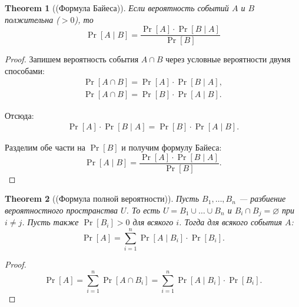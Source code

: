 \documentclass[a4paper]{article}
\theoremstyle{named}
\newtheorem*{namedtheorem}{Theorem}
\begin{document}
\begin{colloq}
        \begin{namedtheorem}[(Формула Байеса)]
            Если вероятность событий $A$ и $B$ полжительна ($> 0$), то
            \begin{equation*}
                \Pr[A \mid B] = \dfrac{\Pr[A] \cdot \Pr[B \mid A]}{\Pr[B]}
            \end{equation*}
        \end{namedtheorem}

        \begin{proof}
            Запишем вероятность события $A \cap B$ через условные вероятности двумя способами:
            \[\begin{gathered}
                \Pr[A \cap B] = \Pr[A] \cdot \Pr[B \mid A], \\
                \Pr[A \cap B] = \Pr[B] \cdot \Pr[A \mid B].
            \end{gathered}\]

            Отсюда:
            \[\begin{gathered}
                \Pr[A] \cdot \Pr[B \mid A] = \Pr[B] \cdot \Pr[A \mid B].
            \end{gathered}\]

            Разделим обе части на $\Pr[B]$ и получим формулу Байеса:
            \begin{equation*}
                \Pr[A \mid B] = \dfrac{\Pr[A] \cdot \Pr[B \mid A]}{\Pr[B]}.
            \end{equation*}
        \end{proof}

        \begin{namedtheorem}[(Формула полной вероятности)]
            Пусть $B_1, \dots, B_n$ --- разбиение вероятностного пространства $U$. То есть $U = B_1 \cup \dots \cup B_n$ и $B_i \cap B_j = \varnothing$ при $i \neq j$. Пусть также $\Pr[B_i] > 0$ для всякого $i$. Тогда для всякого события $A$:
            \begin{equation*}
                \Pr[A] = \sum_{i = 1}^n \Pr[A \mid B_i] \cdot \Pr[B_i].
            \end{equation*}
        \end{namedtheorem}

        \begin{proof}
            \begin{equation*}
                \Pr[A] = \sum_{i = 1}^n \Pr[A \cap B_i] = \sum_{i = 1}^n \Pr[A \mid B_i] \cdot \Pr[B_i].
            \end{equation*}


\end{proof}
\end{colloq}
\end{document}
